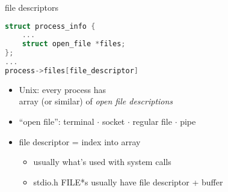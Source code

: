 \begin{frame}[fragile,label=fds]{file descriptors}
\begin{lstlisting}[language=C,style=smaller]
struct process_info {
    ...
    struct open_file *files;
};
...
process->files[file_descriptor]
\end{lstlisting}
    \begin{itemize}
    \item Unix: every process has \\
        array (or similar) of \textit{open file descriptions}
    \item ``open file'': \small terminal $\cdot$ socket $\cdot$ regular file $\cdot$ pipe
    \item file descriptor = index into array
        \begin{itemize}
        \item usually what's used with system calls
        \item stdio.h FILE*s usually have file descriptor + buffer
        \end{itemize}
    \end{itemize}
\end{frame}


